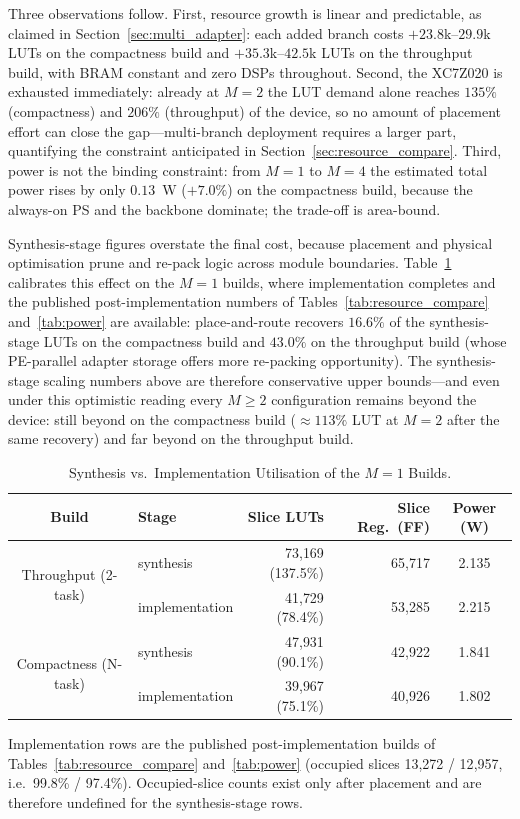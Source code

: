 \documentclass[12pt, a4paper]{report}
\numberwithin{equation}{chapter}
\numberwithin{figure}{chapter}
\numberwithin{table}{chapter}
\numberwithin{algorithm}{chapter}
\begin{document}
Three observations follow. First, resource growth is linear and predictable, as claimed in Section~\ref{sec:multi_adapter}: each added branch costs $+23.8$k--$29.9$k LUTs on the compactness build and $+35.3$k--$42.5$k LUTs on the throughput build, with BRAM constant and zero DSPs throughout. Second, the XC7Z020 is exhausted immediately: already at $M{=}2$ the LUT demand alone reaches $135\%$ (compactness) and $206\%$ (throughput) of the device, so no amount of placement effort can close the gap---multi-branch deployment requires a larger part, quantifying the constraint anticipated in Section~\ref{sec:resource_compare}. Third, power is not the binding constraint: from $M{=}1$ to $M{=}4$ the estimated total power rises by only $0.13$~W ($+7.0\%$) on the compactness build, because the always-on PS and the backbone dominate; the trade-off is area-bound.

Synthesis-stage figures overstate the final cost, because placement and physical optimisation prune and re-pack logic across module boundaries. Table~\ref{tab:synth_vs_impl} calibrates this effect on the $M{=}1$ builds, where implementation completes and the published post-implementation numbers of Tables~\ref{tab:resource_compare} and~\ref{tab:power} are available: place-and-route recovers $16.6\%$ of the synthesis-stage LUTs on the compactness build and $43.0\%$ on the throughput build (whose PE-parallel adapter storage offers more re-packing opportunity). The synthesis-stage scaling numbers above are therefore conservative upper bounds---and even under this optimistic reading every $M \geq 2$ configuration remains beyond the device: still beyond on the compactness build ($\approx 113\%$ LUT at $M{=}2$ after the same recovery) and far beyond on the throughput build.

\begin{table}[H]
\centering
\caption{Synthesis vs.\ Implementation Utilisation of the $M{=}1$ Builds.}
\label{tab:synth_vs_impl}
\small
\renewcommand{\arraystretch}{1.2}%
\setlength{\tabcolsep}{4.5pt}%
\begin{tabular}{clrrc}
\toprule
\textbf{Build} & \textbf{Stage} & \textbf{Slice LUTs} & \textbf{Slice Reg.\ (FF)} & \textbf{Power (W)} \\
\midrule
\multirow{2}{*}{Throughput (2-task)}
 & synthesis            & 73{,}169 (137.5\%) & 65{,}717 & 2.135 \\
 & implementation       & 41{,}729 (78.4\%)  & 53{,}285 & 2.215 \\
\midrule
\multirow{2}{*}{Compactness (N-task)}
 & synthesis            & 47{,}931 (90.1\%)  & 42{,}922 & 1.841 \\
 & implementation       & 39{,}967 (75.1\%)  & 40{,}926 & 1.802 \\
\bottomrule
\end{tabular}
\begin{flushleft}
\footnotesize Implementation rows are the published post-implementation builds of Tables~\ref{tab:resource_compare} and~\ref{tab:power} (occupied slices 13{,}272 / 12{,}957, i.e.\ 99.8\% / 97.4\%). Occupied-slice counts exist only after placement and are therefore undefined for the synthesis-stage rows.
\end{flushleft}
\end{table}
\end{document}
